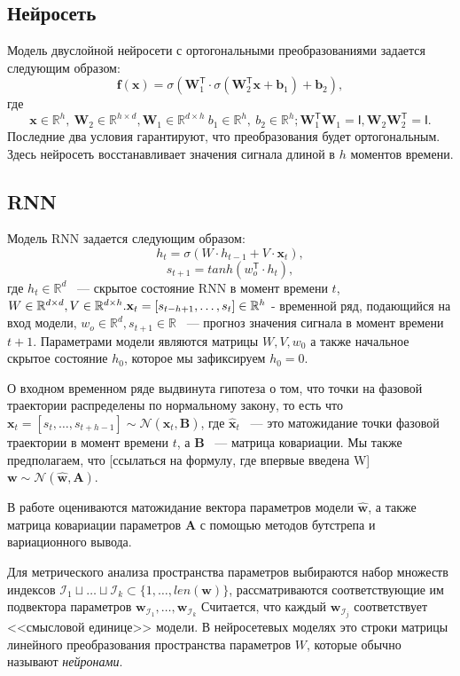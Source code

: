 \documentclass[12pt, twoside]{article}
\begin{document}
\subsection{Нейросеть}
Модель двуслойной нейросети с ортогональными преобразованиями задается следующим образом: \[\mathbf{f}(\mathbf{x}) = \sigma(\mathbf{W}_1^{\mathsf{T}}\cdot \sigma(\mathbf{W}_2^{\mathsf{T}}\mathbf{x} + \mathbf{b}_1) + \mathbf{b}_2),\] где  \[\mathbf{x} \in \mathbb{R}^{h}, \ \mathbf{W}_2 \in \mathbb{R}^{h \times d}, \mathbf{W}_1 \in \mathbb{R}^{d \times h} \ b_1 \in \mathbb{R}^h, \ b_2 \in \mathbb{R}^{h}; \mathbf{W}_1^{\mathsf{T}}\mathbf{W}_1=\mathsf{I}, \mathbf{W}_2\mathbf{W}_2^{\mathsf{T}}=\mathsf{I}.\] Последние два условия гарантируют, что преобразования будет ортогональным. Здесь нейросеть восстанавливает значения сигнала длиной в $h$ моментов времени.

\subsection{RNN}
Модель RNN задается следующим образом: \[ h_t = \sigma(W \cdot h_{t-1} + V \cdot \mathbf{x}_t),\]
\[ s_{t+1} = tanh(w_o^{\mathsf{T}} \cdot h_t), \] где $h_{t} \in \mathbb{R}^{d}$ ~--- скрытое состояние RNN в момент времени $t$, $W \in \mathbb{R}^{d \times d}, V \in \mathbb{R}^{d \times h}. \\
\mathbf{x}_t = [s_{t - h + 1}, \dots, s_{t}] \in \mathbb{R}^h$ - временной ряд, подающийся на вход модели, $w_o \in \mathbb{R}^{d}, s_{t+1} \in \mathbb{R}$ ~--- прогноз значения сигнала в момент времени $t+1$. Параметрами модели являются матрицы $W, V, w_0$ а также начальное скрытое состояние $h_0$, которое мы зафиксируем $h_0=0$.

О входном временном ряде выдвинута гипотеза о том, что точки на фазовой траектории распределены по нормальному закону, то есть что $\mathbf{x}_t = [s_t, \dots, s_{t + h - 1}] \sim \mathcal{N}(\hat{\mathbf{x}}_t, \mathbf{B})$, где $\hat{\mathbf{x}}_t$ ~--- это матожидание точки фазовой траектории в момент времени $t$, а $\mathbf{B}$ ~--- матрица ковариации. Мы также предполагаем, что [ссылаться на формулу, где впервые введена W]$\mathbf{w} \sim \mathcal{N}(\hat{\mathbf{w}}, \mathbf{A})$. 

В работе оцениваются матожидание вектора параметров модели $\hat{\mathbf{w}}$, а также матрица ковариации параметров $\mathbf{A}$ с помощью методов бутстрепа и вариационного вывода.

Для метрического анализа пространства параметров выбираются набор множеств индексов $\mathcal{I}_1 \sqcup \dots \sqcup \mathcal{I}_k \subset \{1, \dots, len(\mathbf{w})\}$, рассматриваются соответствующие им подвектора параметров $\mathbf{w}_{\mathcal{I}_1}, \dots, \mathbf{w}_{\mathcal{I}_k}$
Считается, что каждый $\mathbf{w}_{\mathcal{I}_j}$ соответствует <<смысловой единице>> модели. В нейросетевых моделях это строки матрицы линейного преобразования пространства параметров $W$, которые обычно называют \textit{нейронами}.
\end{document}
